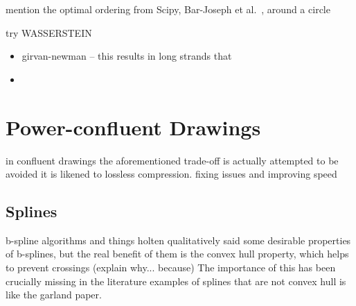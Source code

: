 mention the optimal ordering from Scipy, Bar-Joseph et al.~\cite{TODO}, around a circle

try WASSERSTEIN

\begin{itemize}
    \item girvan-newman -- this results in long strands that \item
\end{itemize}

\section{Power-confluent Drawings}
in confluent drawings the aforementioned trade-off is actually attempted to be avoided
it is likened to lossless compression.
fixing issues and improving speed
\subsection{Splines}
b-spline algorithms and things
holten qualitatively said some desirable properties of b-splines, but the real benefit of them is the convex hull property, which helps to prevent crossings (explain why... because)
The importance of this has been crucially missing in the literature
examples of splines that are not convex hull is like the garland paper.
